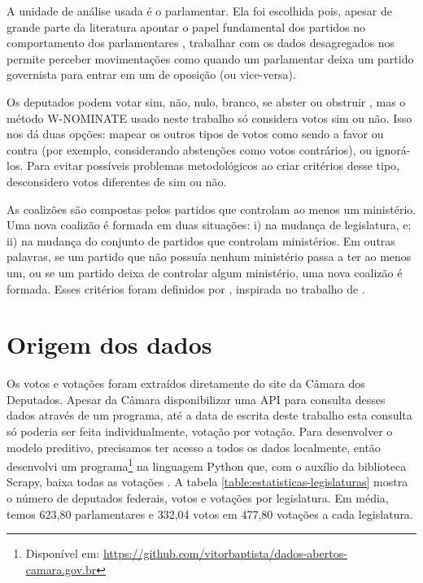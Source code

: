 \documentclass[a4paper,titlepage]{ppgi}\usepackage[]{graphicx}\usepackage[]{color}
\begin{document}
A unidade de análise usada é o parlamentar. Ela foi escolhida pois, apesar de
grande parte da literatura apontar o papel fundamental dos partidos no
comportamento dos parlamentares \cite{Figueiredo2001,Santos2003}, trabalhar com
os dados desagregados nos permite perceber movimentações como quando um
parlamentar deixa um partido governista para entrar em um de oposição (ou
vice-versa).


Os deputados podem votar sim, não, nulo, branco, se abster ou obstruir
\cite{Carneiro2013}, mas o método W-NOMINATE usado neste trabalho só considera
votos sim ou não. Isso nos dá duas opções: mapear os outros tipos de votos como
sendo a favor ou contra (por exemplo, considerando abstenções como votos
contrários), ou ignorá-los. Para evitar possíveis problemas metodológicos ao
criar critérios desse tipo, desconsidero votos diferentes de sim ou não.


As coalizões são compostas pelos partidos que controlam ao menos um ministério.
Uma nova coalizão é formada em duas situações: i) na mudança de legislatura, e;
ii) na mudança do conjunto de partidos que controlam ministérios. Em outras
palavras, se um partido que não possuía nenhum ministério passa a ter ao menos
um, ou se um partido deixa de controlar algum ministério, uma nova coalizão é
formada. Esses critérios foram definidos por ,
inspirada no trabalho de .


\section{Origem dos dados}




Os votos e votações foram extraídos diretamente do site da Câmara dos
Deputados. Apesar da Câmara disponibilizar uma \gls{API} para consulta desses
dados através de um programa, até a data de escrita deste trabalho esta
consulta só poderia ser feita individualmente, votação por votação. Para
desenvolver o modelo preditivo, precisamos ter acesso a todos os dados
localmente, então desenvolvi um programa\footnote{Disponível em:
\url{https://github.com/vitorbaptista/dados-abertos-camara.gov.br}} na
linguagem Python que, com o auxílio da biblioteca Scrapy, baixa todas as
votações \cite{Python276,Scrapy}. A tabela
\ref{table:estatisticas-legislaturas} mostra o número de deputados federais,
votos e votações por legislatura. Em média, temos 623,80
parlamentares e 332,04 votos em
477,80 votações a cada legislatura.
\nocite{CamaraDosDeputados2015}
\end{document}
